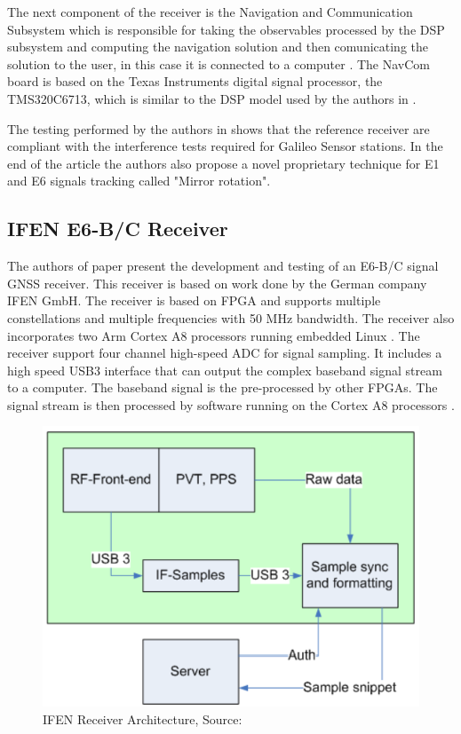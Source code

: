 The next component of the receiver is the Navigation and Communication Subsystem which is responsible for taking the observables processed by the DSP subsystem and computing the navigation solution and then comunicating the solution to the user, in this case it is connected to a computer \cite{ref_station_receiver}. The NavCom board is based on the Texas Instruments digital signal processor, the TMS320C6713, which is similar to the DSP model used by the authors in \cite{dsp_receiver}.

The testing performed by the authors in \cite{ref_station_receiver} shows that the reference receiver are compliant with the interference tests required for Galileo Sensor stations. In the end of the article the authors also propose a novel proprietary technique for E1 and E6 signals tracking called "Mirror rotation"\cite{ref_station_receiver}. 

\subsection{IFEN E6-B/C Receiver\cite{e6breceiver}}
\label{subsec:e6b_recv}
The authors of paper \cite{e6breceiver} present the development and testing of an E6-B/C signal GNSS receiver. This receiver is based on work done by the German company IFEN GmbH. The receiver is based on FPGA and supports multiple constellations and multiple frequencies with 50 MHz bandwidth. The receiver also incorporates two Arm Cortex A8 processors running embedded Linux \cite{e6breceiver}. The receiver support four channel high-speed ADC for signal sampling. It includes a high speed USB3 interface that can output the complex baseband signal stream to a computer. The baseband signal is the pre-processed by other FPGAs. The signal stream is then processed by software running on the Cortex A8 processors \cite{e6breceiver}.

\begin{figure}[h]
\centering
\includegraphics[scale=0.7]{img/e6b_architecture.png}
\caption{IFEN Receiver Architecture, Source:\cite{e6breceiver}}
\label{fig:e6b_architecture}
\end{figure}

